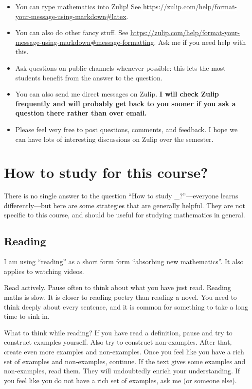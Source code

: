 \documentclass{amsart}
\begin{document}
\begin{enumerate}
\begin{itemize}
\item You can type mathematics into Zulip! See \url{https://zulip.com/help/format-your-message-using-markdown\#latex}.
\item You can also do other fancy stuff. See \url{https://zulip.com/help/format-your-message-using-markdown\#message-formatting}. Ask me if you need help with this.
\item Ask questions on public channels whenever possible: this lets the most students benefit from the answer to the question.
\item You can also send me direct messages on Zulip. \textbf{I will check Zulip frequently and will probably get back to you sooner if you ask a question there rather than over email.}
\item Please feel very free to post questions, comments, and feedback. I hope we can have lots of interesting discussions on Zulip over the semester.
\end{itemize}
\end{enumerate}
\section{How to study for this course?}
\label{sec:org0e2184b}
There is no single answer to the question ``How to study \uline{\_}?''---everyone learns differently---but here are some strategies that are generally helpful.
They are not specific to this course, and should be useful for studying mathematics in general.
\subsection{Reading}
\label{sec:org40538c4}
I am using ``reading'' as a short form form ``absorbing new mathematics''.
It also applies to watching videos.

Read actively.
Pause often to think about what you have just read.
Reading maths is slow.
It is closer to reading poetry than reading a novel.
You need to think deeply about every sentence, and it is common for something to take a long time to sink in.

What to think while reading?
If you have read a definition, pause and try to construct examples yourself.
Also try to construct non-examples.
After that, create even more examples and non-examples.
Once you feel like you have a rich set of examples and non-examples, continue.
If the text gives some examples and non-examples, read them.
They will undoubtedly enrich your understanding.
If you feel like you do not have a rich set of examples, ask me (or someone else).
\end{document}
